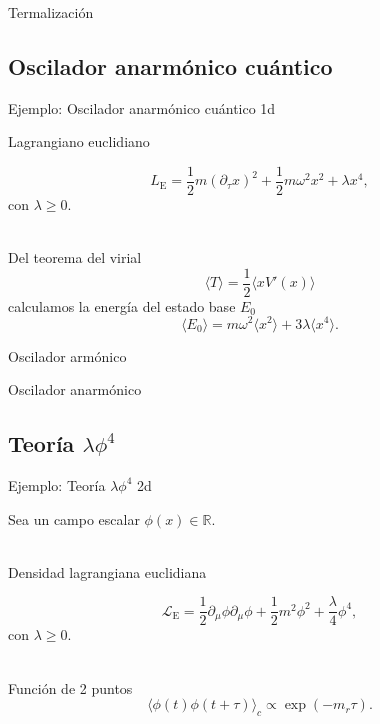 \documentclass[11pt]{beamer}
\begin{document}
\begin{frame}{Termalización}
\end{frame}

\subsection{Oscilador anarmónico cuántico}
\begin{frame}{Ejemplo: Oscilador anarmónico cuántico 1d}

    Lagrangiano euclidiano

    $$ L_{\text{E}} = \frac{1}{2}m\left(\partial_{\tau}x\right)^2 + \frac{1}{2}m\omega^2 x^2 + \lambda x^4,$$
con $\lambda \ge 0$. \\~

Del teorema del virial 
$$\langle T \rangle = \frac{1}{2}\langle x V'(x) \rangle$$
calculamos la energía del estado base $E_0$ 
$$ \langle E_0 \rangle = m\omega^2\langle x^2 \rangle + 3\lambda \langle x^4 \rangle. $$
\end{frame}

\begin{frame}{Oscilador armónico}
\end{frame}

\begin{frame}{Oscilador anarmónico}
\end{frame}

\subsection{Teoría $\lambda \phi^4$}
\begin{frame}{Ejemplo: Teoría $\lambda \phi^4$ 2d}

Sea un campo escalar $\phi(x)\in\mathbb{R}$.\\~

Densidad lagrangiana euclidiana

    $$ \mathcal{L}_{\text{E}} = \frac{1}{2}\partial_{\mu} \phi \partial_{\mu}\phi + \frac{1}{2}m^2  \phi^2 + \frac{\lambda}{4} \phi^4,$$
    con $\lambda \ge 0$. \\~
    
	Función de 2 puntos
	$$ \langle \phi(t)\phi(t + \tau)  \rangle_c \propto \exp(-m_r \tau).$$    
    
\end{frame}
\end{document}
